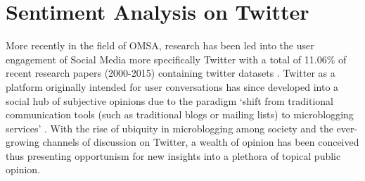 \documentclass[11pt]{report}
\begin{document}
\section{Sentiment Analysis on Twitter}
More recently in the field of OMSA, research has been led into the user engagement of Social Media more specifically Twitter with a total of 11.06\% of recent research papers (2000-2015) containing twitter datasets \citep{piryani_analytical_2016}. Twitter as a platform originally intended for user conversations has since developed into a social hub of subjective opinions due to the paradigm `shift from traditional communication tools (such as traditional blogs or mailing lists) to microblogging services' \citep{pak_twitter_2010}. With the rise of ubiquity in microblogging among society and the ever-growing channels of discussion on Twitter, a wealth of opinion has been conceived thus presenting opportunism for new insights into a plethora of topical public opinion.
\end{document}
